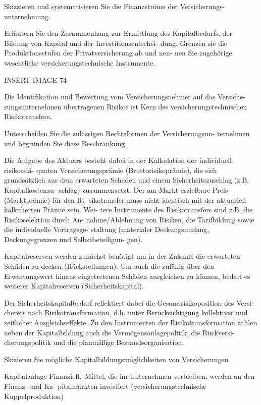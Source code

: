 Skizzieren und systematisieren Sie die Finanzströme der Versicherungs-
unternehmung. 



Erläutern Sie den Zusammenhang zur Ermittlung des
Kapitalbedarfs, der Bildung von Kapital und der Investitionsentschei-
dung. Grenzen sie die Produktionsstufen der Privatversicherung ab und nen-
nen Sie zugehörige wesentliche versicherungstechnische Instrumente.

INSERT IMAGE 74


Die Identifikation und Bewertung vom Versicherungsnehmer auf das Versiche-
rungsunternehmen übertragenen Risikos ist Kern des versicherungstechnischen
Risikotransfers.


Unterscheiden Sie die zulässigen Rechtsformen der Versicherungsun-
ternehmen und begründen Sie diese Beschränkung.

Die Aufgabe des Aktuars besteht dabei in der Kalkulation der individuell risikoadä-
quaten Versicherungsprämie (Bruttorisikoprämie), die sich grundsätzlich aus
dem erwarteten Schaden und einem Sicherheitszuschlag (z.B. Kapitalkostenzu-
schlag) zusammensetzt. Der am Markt erzielbare Preis (Marktprämie) für den Ri-
sikotransfer muss nicht identisch mit der aktuariell kalkulierten Prämie sein. Wei-
tere Instrumente des Risikotransfers sind z.B. die Risikoselektion durch An-
nahme/Ablehnung von Risiken, die Tarifbildung sowie die individuelle Vertragsge-
staltung (materialer Deckungsumfang, Deckungsgrenzen und Selbstbeteiligun-
gen).


Kapitalreserven werden zunächst benötigt um in der Zukunft die erwarteten Schäden zu
decken (Rückstellungen). Um auch die zufällig über den Erwartungswert hinaus
eingetretenen Schäden ausgleichen zu können, bedarf es weiterer Kapitalreserven
(Sicherheitskapital).

Der Sicherheitskapitalbedarf reflektiert dabei die Gesamtrisikoposition des Versi-
cherers nach Risikotransformation, d.h. unter Berücksichtigung kollektiver und
zeitlicher Ausgleichseffekte. Zu den Instrumenten der Risikotransformation
zählen neben der Kapitalbildung auch die Vermögensanlagepolitik, die Rückversi-
cherungspolitik und die planmäßige Bestandsorganisation.



Skizieren Sie mögliche Kapitalbildungsmöglichkeiten von Versicherungen

Kapitalanlage
Finanzielle Mittel, die im Unternehmen verbleiben, werden an den Finanz- und Ka-
pitalmärkten investiert (versicherungstechnische Kuppelproduktion)

